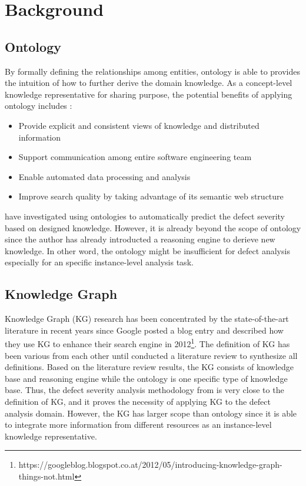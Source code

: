 \documentclass[12pt] {article}
\begin{document}
\section{Background}
\subsection{Ontology}
By formally defining the relationships among entities, ontology is able to provides the intuition of how to further derive the domain knowledge.
As a concept-level knowledge representative for sharing purpose, the potential benefits of applying ontology includes \cite{christina2016an}:
\begin{itemize}
    \item Provide explicit and consistent views of knowledge and distributed information
    \item Support communication among entire software engineering team 
    \item Enable automated data processing and analysis
    \item Improve search quality by taking advantage of its semantic web structure
\end{itemize}
 have investigated using ontologies to automatically predict the defect severity based on designed knowledge.
However, it is already beyond the scope of ontology since the author has already introducted a reasoning engine to derieve new knowledge.  
In other word, the ontology might be insufficient for defect analysis especially for an specific instance-level analysis task. 

\subsection{Knowledge Graph}
Knowledge Graph (KG) research has been concentrated by the state-of-the-art literature in recent years since Google posted a blog entry and described how they use KG to enhance their search engine in 2012\footnote{https://googleblog.blogspot.co.at/2012/05/introducing-knowledge-graph-things-not.html}.
The definition of KG has been various from each other until  conducted a literature review to synthesize all definitions.
Based on the literature review results, the KG consists of knowledge base and reasoning engine while the ontology is one specific type of knowledge base.
Thus, the defect severity analysis methodology from  is very close to the definition of KG, and it proves the necessity of applying KG to the defect analysis domain. 
However, the KG has larger scope than ontology since it is able to integrate more information from different resources as an instance-level knowledge representative. 
\end{document}
